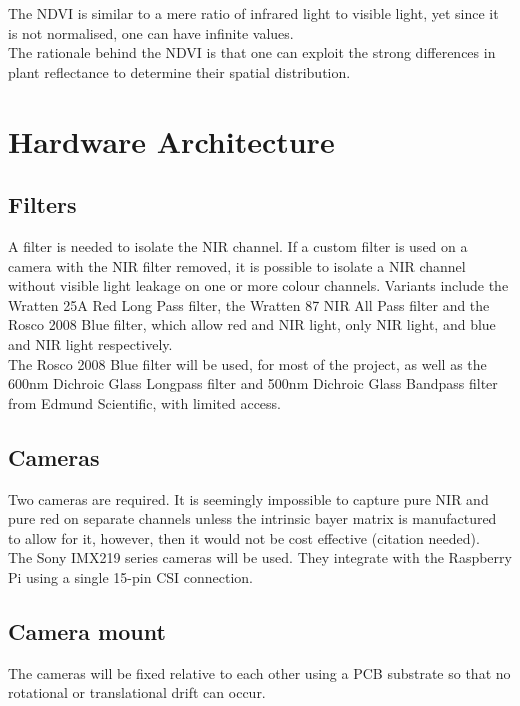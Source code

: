 The NDVI is similar to a mere ratio of infrared light to visible light, yet since it is not normalised, one can have infinite values.\\

The rationale behind the NDVI is that one can exploit the strong differences in plant reflectance to determine their spatial distribution.\\

\section{Hardware Architecture}

\subsection{Filters}

A filter is needed to isolate the NIR channel. If a custom filter is used on a camera with the NIR filter removed, it is possible to isolate a NIR channel without visible light leakage on one or more colour channels. Variants include the Wratten 25A Red Long Pass filter, the Wratten 87 NIR All Pass filter and the Rosco 2008 Blue filter, which allow red and NIR light, only NIR light, and blue and NIR light respectively.\\

The Rosco 2008 Blue filter will be used, for most of the project, as well as the 600nm Dichroic Glass Longpass filter and 500nm Dichroic Glass Bandpass filter from Edmund Scientific, with limited access.

\subsection{Cameras}

Two cameras are required. It is seemingly impossible to capture pure NIR and pure red on separate channels unless the intrinsic bayer matrix is manufactured to allow for it, however, then it would not be cost effective (citation needed).\\

The Sony IMX219 series cameras will be used. They integrate with the Raspberry Pi using a single 15-pin CSI connection.

\subsection{Camera mount}

The cameras will be fixed relative to each other using a PCB substrate so that no rotational or translational drift can occur.

